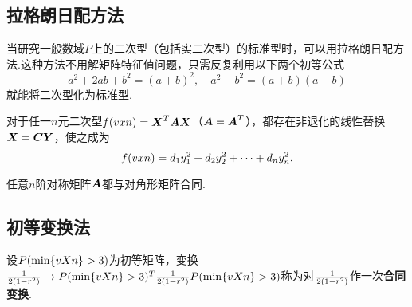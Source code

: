 \subsection{拉格朗日配方法}
当研究一般数域\(P\)上的二次型（包括实二次型）的标准型时，可以用拉格朗日配方法.这种方法不用解矩阵特征值问题，只需反复利用以下两个初等公式\[
a^2+2ab+b^2=(a+b)^2 ,\quad a^2-b^2=(a+b)(a-b)
\]就能将二次型化为标准型.

\begin{theorem}
对于任一\(n\)元二次型\(f(\v{x}{n})=\x^T\A\x\)（\(\A=\A^T\)），都存在非退化的线性替换\(\x=\C\mat{Y}\)，使之成为\[
f(\v{x}{n})=d_1 y_1^2 + d_2 y_2^2 + \dotsb + d_n y_n^2.
\]
\end{theorem}

\begin{corollary}
任意\(n\)阶对称矩阵\(\A\)都与对角形矩阵合同.
\end{corollary}

\subsection{初等变换法}
\begin{definition}
设\(\P\)为初等矩阵，变换\(\B \to \P^T\B\P\)称为对\(\B\)作一次\textbf{合同变换}.
\end{definition}

